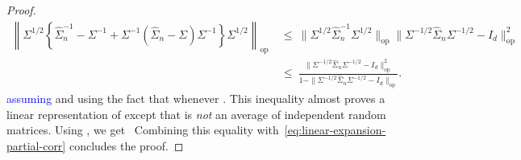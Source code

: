 \documentclass{article}
\begin{document}
\begin{appendices}
\begin{proof}
\begin{equation}\label{eq:linear-expansion-partial-corr}
\begin{split}
\left\|\Sigma^{1/2}\left\{\widehat{\Sigma}_n^{-1} - \Sigma^{-1} + \Sigma^{-1}(\widehat{\Sigma}_n - \Sigma)\Sigma^{-1}\right\}\Sigma^{1/2}\right\|_{\mathrm{op}} ~&\le~ \|\Sigma^{1/2}\widehat{\Sigma}_n^{-1}\Sigma^{1/2}\|_{\mathrm{op}}\|\Sigma^{-1/2}\widehat{\Sigma}_n\Sigma^{-1/2} - I_d\|_{\mathrm{op}}^2\\ ~&\le~ \frac{\|\Sigma^{-1/2}\widehat{\Sigma}_n\Sigma^{-1/2} - I_d\|_{\mathrm{op}}^2}{1 - \|\Sigma^{-1/2}\widehat{\Sigma}_n\Sigma^{-1/2} - I_d\|_{\mathrm{op}}}.
\end{split}
\end{equation}
\textcolor{blue}{assuming  } and using the fact that   whenever  .
This inequality almost proves a linear representation of   except that   is \emph{not} an average of independent random matrices. Using  , we get
\ Combining this equality with~\eqref{eq:linear-expansion-partial-corr} concludes the proof.
\end{proof}

\end{appendices}
\end{document}
